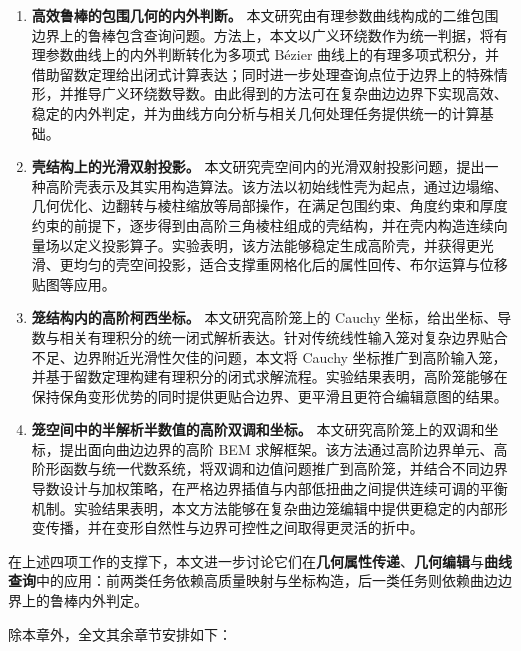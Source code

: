\begin{enumerate}
  \item \textbf{高效鲁棒的包围几何的内外判断。}
  本文研究由有理参数曲线构成的二维包围边界上的鲁棒包含查询问题。方法上，本文以广义环绕数作为统一判据，将有理参数曲线上的内外判断转化为多项式 B\'{e}zier 曲线上的有理多项式积分，并借助留数定理给出闭式计算表达；同时进一步处理查询点位于边界上的特殊情形，并推导广义环绕数导数。由此得到的方法可在复杂曲边边界下实现高效、稳定的内外判定，并为曲线方向分析与相关几何处理任务提供统一的计算基础。
  \item \textbf{壳结构上的光滑双射投影。}
  本文研究壳空间内的光滑双射投影问题，提出一种高阶壳表示及其实用构造算法。该方法以初始线性壳为起点，通过边塌缩、几何优化、边翻转与棱柱缩放等局部操作，在满足包围约束、角度约束和厚度约束的前提下，逐步得到由高阶三角棱柱组成的壳结构，并在壳内构造连续向量场以定义投影算子。实验表明，该方法能够稳定生成高阶壳，并获得更光滑、更均匀的壳空间投影，适合支撑重网格化后的属性回传、布尔运算与位移贴图等应用。
  \item \textbf{笼结构内的高阶柯西坐标。}
  本文研究高阶笼上的 Cauchy 坐标，给出坐标、导数与相关有理积分的统一闭式解析表达。针对传统线性输入笼对复杂边界贴合不足、边界附近光滑性欠佳的问题，本文将 Cauchy 坐标推广到高阶输入笼，并基于留数定理构建有理积分的闭式求解流程。实验结果表明，高阶笼能够在保持保角变形优势的同时提供更贴合边界、更平滑且更符合编辑意图的结果。
  \item \textbf{笼空间中的半解析半数值的高阶双调和坐标。}
  本文研究高阶笼上的双调和坐标，提出面向曲边边界的高阶 BEM 求解框架。该方法通过高阶边界单元、高阶形函数与统一代数系统，将双调和边值问题推广到高阶笼，并结合不同边界导数设计与加权策略，在严格边界插值与内部低扭曲之间提供连续可调的平衡机制。实验结果表明，本文方法能够在复杂曲边笼编辑中提供更稳定的内部形变传播，并在变形自然性与边界可控性之间取得更灵活的折中。
\end{enumerate}

在上述四项工作的支撑下，本文进一步讨论它们在\textbf{几何属性传递}、\textbf{几何编辑}与\textbf{曲线查询}中的应用：前两类任务依赖高质量映射与坐标构造，后一类任务则依赖曲边边界上的鲁棒内外判定。

除本章外，全文其余章节安排如下：

